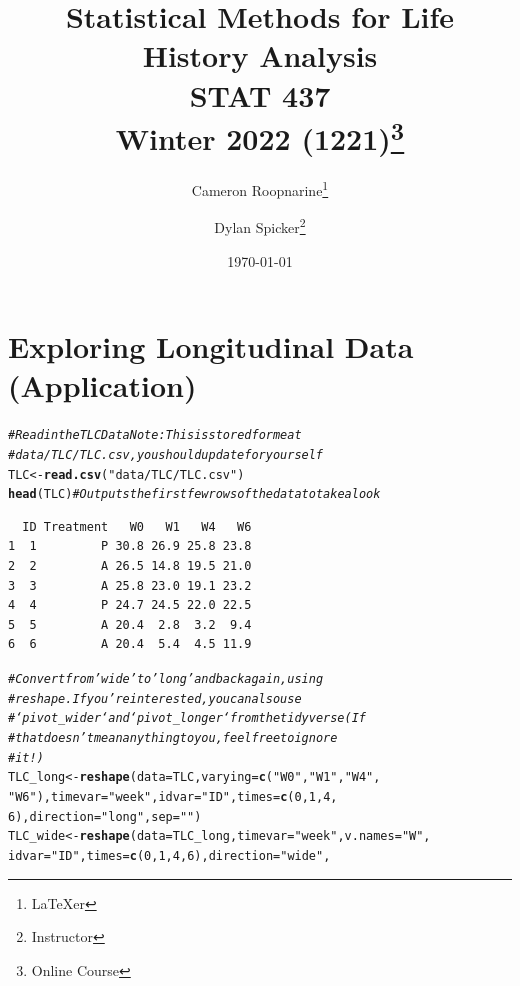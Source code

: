 \documentclass[oneside]{book}\usepackage[]{graphicx}\usepackage[svgnames]{xcolor}
\title{%
\LARGE Statistical Methods for Life History Analysis\\%
\large STAT 437\\%
\normalsize Winter 2022 (1221)\thanks{Online Course}}%
\author{Cameron Roopnarine\thanks{\LaTeX{}er}\and Dylan Spicker\thanks{Instructor}}%
\date{\today}%
\makeatletter
\newcommand{\hlnum}[1]{\textcolor[rgb]{0.686,0.059,0.569}{#1}}%
\newcommand{\hlstr}[1]{\textcolor[rgb]{0.192,0.494,0.8}{#1}}%
\newcommand{\hlcom}[1]{\textcolor[rgb]{0.678,0.584,0.686}{\textit{#1}}}%
\newcommand{\hlstd}[1]{\textcolor[rgb]{0.345,0.345,0.345}{#1}}%
\newcommand{\hlkwb}[1]{\textcolor[rgb]{0.69,0.353,0.396}{#1}}%
\newcommand{\hlkwc}[1]{\textcolor[rgb]{0.333,0.667,0.333}{#1}}%
\newcommand{\hlkwd}[1]{\textcolor[rgb]{0.737,0.353,0.396}{\textbf{#1}}}%
\newenvironment{kframe}{%
 \def\at@end@of@kframe{}%
 \ifinner\ifhmode%
  \def\at@end@of@kframe{\end{minipage}}%
  \begin{minipage}{\columnwidth}%
 \fi\fi%
 \def\FrameCommand##1{\hskip\@totalleftmargin \hskip-\fboxsep
 \colorbox{shadecolor}{##1}\hskip-\fboxsep
     \hskip-\linewidth \hskip-\@totalleftmargin \hskip\columnwidth}%
 \MakeFramed {\advance\hsize-\width
   \@totalleftmargin\z@ \linewidth\hsize
   \@setminipage}}%
 {\par\unskip\endMakeFramed%
 \at@end@of@kframe}
\newenvironment{knitrout}{}{} %
\makeatother
\begin{document}
\maketitle
\tableofcontents


\section{Exploring Longitudinal Data (Application)}
\begin{knitrout}
\color{fgcolor}\begin{kframe}
\begin{alltt}
\hlcom{# Read in the TLC Data Note: This is stored for me at}
\hlcom{# data/TLC/TLC.csv, you should update for yourself}
\hlstd{TLC} \hlkwb{<-} \hlkwd{read.csv}\hlstd{(}\hlstr{"data/TLC/TLC.csv"}\hlstd{)}
\hlkwd{head}\hlstd{(TLC)}  \hlcom{# Outputs the first few rows of the data to take a look}
\end{alltt}
\begin{verbatim}
  ID Treatment   W0   W1   W4   W6
1  1         P 30.8 26.9 25.8 23.8
2  2         A 26.5 14.8 19.5 21.0
3  3         A 25.8 23.0 19.1 23.2
4  4         P 24.7 24.5 22.0 22.5
5  5         A 20.4  2.8  3.2  9.4
6  6         A 20.4  5.4  4.5 11.9
\end{verbatim}
\begin{alltt}
\hlcom{# Convert from 'wide' to 'long' and back again, using}
\hlcom{# reshape.  If you're interested, you can also use}
\hlcom{# `pivot_wider` and `pivot_longer` from the tidyverse (If}
\hlcom{# that doesn't mean anything to you, feel free to ignore}
\hlcom{# it!)}
\hlstd{TLC_long} \hlkwb{<-} \hlkwd{reshape}\hlstd{(}\hlkwc{data} \hlstd{= TLC,} \hlkwc{varying} \hlstd{=} \hlkwd{c}\hlstd{(}\hlstr{"W0"}\hlstd{,} \hlstr{"W1"}\hlstd{,} \hlstr{"W4"}\hlstd{,}
  \hlstr{"W6"}\hlstd{),} \hlkwc{timevar} \hlstd{=} \hlstr{"week"}\hlstd{,} \hlkwc{idvar} \hlstd{=} \hlstr{"ID"}\hlstd{,} \hlkwc{times} \hlstd{=} \hlkwd{c}\hlstd{(}\hlnum{0}\hlstd{,} \hlnum{1}\hlstd{,} \hlnum{4}\hlstd{,}
  \hlnum{6}\hlstd{),} \hlkwc{direction} \hlstd{=} \hlstr{"long"}\hlstd{,} \hlkwc{sep} \hlstd{=} \hlstr{""}\hlstd{)}
\hlstd{TLC_wide} \hlkwb{<-} \hlkwd{reshape}\hlstd{(}\hlkwc{data} \hlstd{= TLC_long,} \hlkwc{timevar} \hlstd{=} \hlstr{"week"}\hlstd{,} \hlkwc{v.names} \hlstd{=} \hlstr{"W"}\hlstd{,}
  \hlkwc{idvar} \hlstd{=} \hlstr{"ID"}\hlstd{,} \hlkwc{times} \hlstd{=} \hlkwd{c}\hlstd{(}\hlnum{0}\hlstd{,} \hlnum{1}\hlstd{,} \hlnum{4}\hlstd{,} \hlnum{6}\hlstd{),} \hlkwc{direction} \hlstd{=} \hlstr{"wide"}\hlstd{,}

\end{alltt}
\end{kframe}
\end{knitrout}
\end{document}
